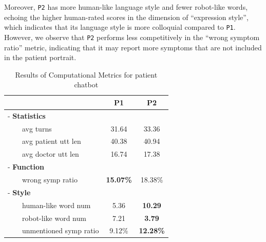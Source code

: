Moreover, \texttt{P2} has more human-like language style and fewer robot-like words, echoing the higher human-rated scores in the dimension of ``expression style'', which indicates that its language style is more colloquial compared to \texttt{P1}. 
However, we observe that \texttt{P2} performs less competitively in the ``wrong symptom ratio'' metric, indicating that it may report more symptoms that are not included in the patient portrait. 



\begin{table}[th]
    \footnotesize
    \centering
    \begin{tabular}{l|cc}
    \hline
    & P1 & P2 \\ 
    \hline
    - \textbf{Statistics} & & \\
    ~~~~avg turns & 31.64 & 33.36\\
    ~~~~avg patient utt len & 40.38 & 40.94 \\
    ~~~~avg doctor utt len & 16.74 & 17.38 \\
    \hline
    - \textbf{Function} & & \\
    ~~~~wrong symp ratio & \textbf{15.07\%} & 18.38\%   \\
    \hline
    - \textbf{Style} & & \\
    ~~~~human-like word num & 5.36 & \textbf{10.29}   \\
    ~~~~robot-like word num & 7.21 & \textbf{3.79} 	  \\
    ~~~~unmentioned symp ratio &  9.12\% & \textbf{12.28\%} \\
    \hline
    \end{tabular}
    \caption{Results of Computational Metrics for patient chatbot}
    \label{tab:auto_pat}
\end{table}

